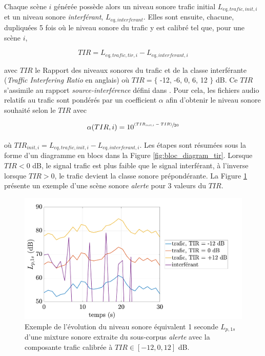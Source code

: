 Chaque scène $i$ générée possède alors un niveau sonore trafic initial $L_{eq,trafic,init,i}$ et un niveau sonore \textit{interférant}, $L_{eq,interferant}$. Elles sont ensuite, chacune, dupliquées 5 fois où le niveau sonore du trafic y est calibré tel que, pour une scène $i$, 

\begin{equation}
TIR = L_{eq,trafic, tir, i} - L_{eq,interferant, i}
\end{equation}

avec $TIR$ le Rapport des niveaux sonores du trafic et de la classe interférante (\textit{Traffic Interfering Ratio} en anglais) où $TIR = \lbrace$ -12, -6, 0, 6, 12 $\rbrace$ dB. Ce $TIR$ s'assimile au rapport \textit{source-interférence} défini dans \cite{vincent2006performance}. Pour cela, les fichiers audio relatifs au trafic sont pondérés par un coefficient $\alpha$ afin d'obtenir le niveau sonore souhaité selon le $TIR$ avec

\begin{equation}
\alpha(TIR,i) = 10^{\sfrac{(TIR_{init,i}-TIR)}{20}}
\end{equation}

où $TIR_{init,i} = L_{eq,trafic,init,i}-L_{eq,interferant,i}$. Les étapes sont résumées sous la forme d'un diagramme en blocs dans la Figure \ref{fig:bloc_diagram_tir}. Lorsque $TIR < 0$ dB, le signal trafic est plus faible que le signal interférant, à l'inverse lorsque $TIR>0$, le trafic devient la classe sonore prépondérante. La Figure \ref{fig:exemple_TIR} présente un exemple d'une scène sonore \textit{alerte} pour 3 valeurs du $TIR$.

\begin{figure}[ht]
\centering
\includegraphics[width=0.7\linewidth]{./figures/NMF/Lp_TIR.pdf}
\caption{Exemple de l'évolution du niveau sonore équivalent 1 seconde $L_{p,1s}$ d'une mixture sonore extraite du sous-corpus \textit{alerte} avec la composante trafic calibrée à $TIR \in \left[-12, 0, 12\right]$ dB.}
\label{fig:exemple_TIR}
\end{figure}


